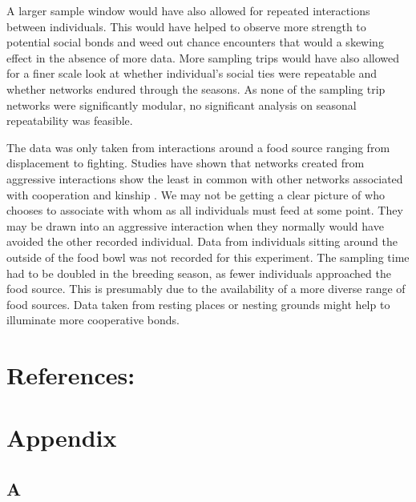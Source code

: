 \documentclass[11pt]{article}
\begin{document}
\par A larger sample window would have also allowed for repeated interactions between individuals.  This would have helped to observe more strength to potential social bonds and weed out chance encounters that would a skewing effect in the absence of more data.  More sampling trips would have also allowed for a finer scale look at whether individual’s social ties were repeatable and whether networks endured through the seasons.  As none of the sampling trip networks were significantly modular, no significant analysis on seasonal repeatability was feasible.  
\par The data was only taken from interactions around a food source ranging from displacement to fighting.  Studies have shown that networks created from aggressive interactions show the least in common with other networks associated with cooperation and kinship \citep{KULAHCI2018217}.  We may not be getting a clear picture of who chooses to associate with whom as all individuals must feed at some point.  They may be drawn into an aggressive interaction when they normally would have avoided the other recorded individual.  Data from individuals sitting around the outside of the food bowl was not recorded for this experiment.  The sampling time had to be doubled in the breeding season, as fewer individuals approached the food source.  This is presumably due to the availability of a more diverse range of food sources.  Data taken from resting places or nesting grounds might help to illuminate more cooperative bonds.  

\newpage
\section{References:}
\renewcommand\refname{}





\newpage
\section{Appendix}
\subsection{A}

\centering
{}
\end{document}

